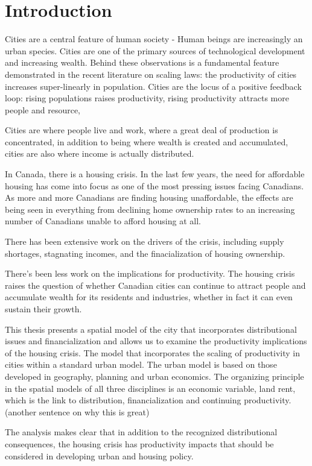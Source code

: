 \chapter{Introduction}

Cities are a central feature of human society - Human beings are increasingly an urban species. Cities are one of the primary sources of technological development and increasing wealth. Behind these observations is a fundamental feature demonstrated in the recent literature on scaling laws: the productivity of cities increases super-linearly in population. Cities are the locus of a positive feedback loop: rising populations raises productivity, rising productivity attracts more people and resource,

Cities are where people live and work, where a great deal of production is concentrated, in addition to being where wealth is created and accumulated, cities are also where income is actually distributed. 

In Canada, there is a housing crisis. In the last few years, the need for affordable housing has come into focus as one of the most pressing issues facing Canadians. As more and more Canadians are finding housing unaffordable, the effects are being seen in everything from declining home ownership rates to an increasing number of Canadians unable to afford housing at all.

There has been extensive work on the drivers of the crisis, including supply shortages, stagnating incomes, and the finacialization of housing ownership.

There's been less work on the implications for productivity. The housing crisis raises the question of whether Canadian cities can continue to attract people and accumulate wealth for its residents and industries, whether in fact it can even sustain their growth.

This thesis presents a spatial model of the city that incorporates distributional issues and financialization and allows us to examine the productivity implications of the housing crisis. The model that incorporates the scaling of productivity in cities within a standard urban model. 
The urban model is based on those developed in geography, planning and urban economics. The organizing principle in  the spatial models of all three disciplines is an economic variable, land rent, which is the link to distribution, financialization and continuing productivity. (another sentence on why this is great)

The analysis makes clear that in addition to the recognized distributional consequences, the housing crisis has  productivity impacts that should be considered in developing urban and housing policy. 


